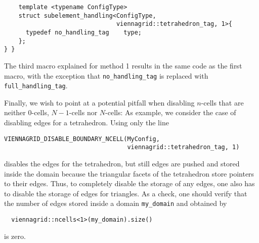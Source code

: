 \begin{itemize}
\begin{lstlisting}
    template <typename ConfigType>
    struct subelement_handling<ConfigType,
                               viennagrid::tetrahedron_tag, 1>{
      typedef no_handling_tag    type;
    };
} }
\end{lstlisting}
The third macro explained for method 1 results in the same code as the first macro, with the exception that \lstinline|no_handling_tag| is replaced with \lstinline|full_handling_tag|.

Finally, we wish to point at a potential pitfall when disabling $n$-cells that are neither $0$-cells, $N-1$-cells nor $N$-cells: As example, we consider the case of disabling edges for a tetrahedron. Using only the line
  \begin{lstlisting}
VIENNAGRID_DISABLE_BOUNDARY_NCELL(MyConfig,
                                  viennagrid::tetrahedron_tag, 1)
  \end{lstlisting}
disables the edges for the tetrahedron, but still edges are pushed and stored inside the domain because the triangular facets of the tetrahedron store pointers to their edges. Thus, to completely disable the storage of any edges, one also has to disable the storage of edges for triangles. As a check, one should verify that the number of edges stored inside a domain \lstinline|my_domain| and obtained by 
 \begin{lstlisting}
  viennagrid::ncells<1>(my_domain).size()
 \end{lstlisting}
is zero.



\end{itemize}

